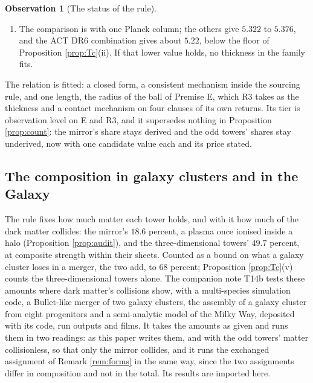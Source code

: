 \documentclass[11pt]{article}
\theoremstyle{definition}
\newtheorem{observation}[theorem]{Observation}
\begin{document}
\begin{observation}[The status of the rule]
\begin{enumerate}
\item[(v)] The comparison is with one Planck column; the others give $5.322$ to $5.376$, and the ACT DR6 combination gives about $5.22$, below the floor of Proposition \ref{prop:Tc}(ii). If that lower value holds, no thickness in the family fits.
\end{enumerate}
The relation is fitted: a closed form, a consistent mechanism inside the sourcing rule, and one length, the radius of the ball of Premise E, which R3 takes as the thickness and a contact mechanism on four clauses of its own returns. Its tier is observation level on E and R3, and it supersedes nothing in Proposition \ref{prop:count}: the mirror's share stays derived and the odd towers' shares stay underived, now with one candidate value each and its price stated.
\end{observation}

\subsection{The composition in galaxy clusters and in the Galaxy}\label{subsec:simulated}

The rule fixes how much matter each tower holds, and with it how much of the dark matter collides: the mirror's $18.6$ percent, a plasma once ionised inside a halo (Proposition \ref{prop:audit}), and the three-dimensional towers' $49.7$ percent, at composite strength within their sheets. Counted as a bound on what a galaxy cluster loses in a merger, the two add, to $68$ percent; Proposition \ref{prop:Tc}(v) counts the three-dimensional towers alone. The companion note T14b \cite{ButlerT14b} tests these amounts where dark matter's collisions show, with a multi-species simulation code, a Bullet-like merger of two galaxy clusters, the assembly of a galaxy cluster from eight progenitors and a semi-analytic model of the Milky Way, deposited with its code, run outputs and films. It takes the amounts as given and runs them in two readings: as this paper writes them, and with the odd towers' matter collisionless, so that only the mirror collides, and it runs the exchanged assignment of Remark \ref{rem:forms} in the same way, since the two assignments differ in composition and not in the total. Its results are imported here.
\end{document}
